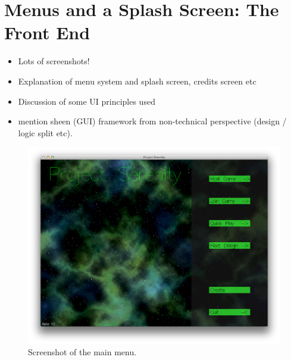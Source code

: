\section{Menus and a Splash Screen: The Front End}

\begin{itemize}
    \item Lots of screenshots!
    \item Explanation of menu system and splash screen, credits screen etc
    \item Discussion of some UI principles used
    \item mention sheen (GUI) framework from non-technical perspective (design / logic split etc).
\end{itemize}

\begin{figure}[p]
	\includegraphics[width=15.5cm]{res/serenityscreens/01-mainmenu}
	\caption[Screenshot of the main menu]{Screenshot of the main menu.}
	\label{fig:mainmenu}
\end{figure}

